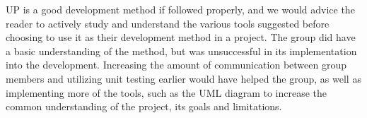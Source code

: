UP is a good development method if followed properly, and we would advice the reader to actively study and understand the various tools suggested before choosing to use it as their development method in a project. The group did have a basic understanding of the method, but was unsuccessful in its implementation into the development. Increasing the amount of communication between group members and utilizing unit testing earlier would have helped the group, as well as implementing more of the tools, such as the UML diagram to increase the common understanding of the project, its goals and limitations.


